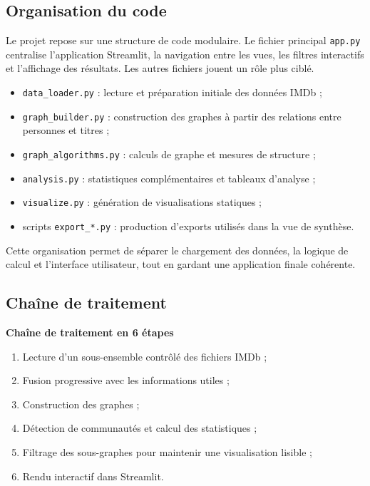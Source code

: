 \documentclass[a4paper,12pt]{article}
\newcommand{\file}[1]{\texttt{\color{imdbblue}#1}}
\begin{document}
\subsection{Organisation du code}

Le projet repose sur une structure de code modulaire. Le fichier principal \file{app.py} centralise l'application Streamlit, la navigation entre les vues, les filtres interactifs et l'affichage des résultats. Les autres fichiers jouent un rôle plus ciblé.

\begin{itemize}[leftmargin=1.4cm, itemsep=3pt]
  \item \file{data_loader.py} : lecture et préparation initiale des données IMDb ;
  \item \file{graph_builder.py} : construction des graphes à partir des relations entre personnes et titres ;
  \item \file{graph_algorithms.py} : calculs de graphe et mesures de structure ;
  \item \file{analysis.py} : statistiques complémentaires et tableaux d'analyse ;
  \item \file{visualize.py} : génération de visualisations statiques ;
  \item scripts \file{export\_*.py} : production d'exports utilisés dans la vue de synthèse.
\end{itemize}

Cette organisation permet de séparer le chargement des données, la logique de calcul et l'interface utilisateur, tout en gardant une application finale cohérente.

\subsection{Chaîne de traitement}

\begin{tcolorbox}[infobox]
\textbf{Chaîne de traitement en 6 étapes}
\begin{enumerate}[leftmargin=1.2cm, itemsep=2pt]
  \item Lecture d'un sous-ensemble contrôlé des fichiers IMDb ;
  \item Fusion progressive avec les informations utiles ;
  \item Construction des graphes ;
  \item Détection de communautés et calcul des statistiques ;
  \item Filtrage des sous-graphes pour maintenir une visualisation lisible ;
  \item Rendu interactif dans Streamlit.
\end{enumerate}
\end{tcolorbox}
\end{document}
